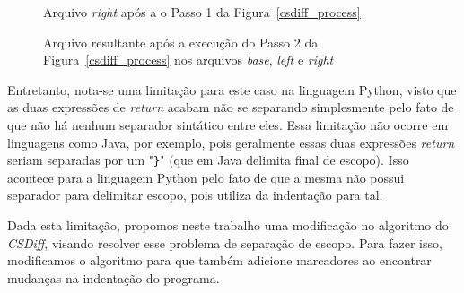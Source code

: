 \begin{figure}[ht]
	\begin{center}
		
        \caption{Arquivo \emph{right} após a o Passo 1 da
        Figura~\ref{csdiff_process}}\label{right_marcadores}
	\end{center}
\end{figure}

\begin{figure}[ht]
	\begin{center}
		
        \caption{Arquivo resultante após a execução do Passo 2 da
        Figura~\ref{csdiff_process} nos arquivos \emph{base}, \emph{left} e
    \emph{right}}\label{diff3_marcadores}
	\end{center}
\end{figure}

Entretanto, nota-se uma limitação para este caso na linguagem Python, visto que
as duas expressões de \emph{return} acabam não se separando simplesmente pelo
fato de que não há nenhum separador sintático entre eles. Essa limitação não
ocorre em linguagens como Java, por exemplo, pois geralmente essas duas
expressões \emph{return} seriam separadas por um "\verb|}|" (que em Java
delimita final de escopo). Isso acontece para a linguagem Python pelo fato de
que a mesma não possui separador para delimitar escopo, pois utiliza da
indentação para tal.

Dada esta limitação, propomos neste trabalho uma modificação no algoritmo do
\emph{CSDiff}, visando resolver esse problema de separação de escopo. Para
fazer isso, modificamos o algoritmo para que também adicione marcadores ao
encontrar mudanças na indentação do programa.


